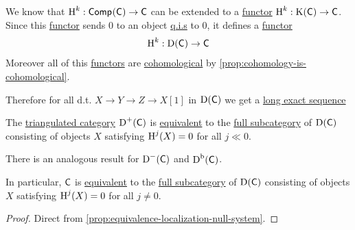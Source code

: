 \documentclass[../../main]{subfiles}
\begin{document}
\begin{remark}
  We know that \(\operatorname{H}^{k}: \mathsf{Comp}^{}(\mathsf{C}) \to \mathsf{C}\) can be extended to a \hyperref[def:functor]{functor} \(\operatorname{H}^{k}: \operatorname{K}(\mathsf{C}) \to \mathsf{C}\).
  Since this \hyperref[def:functor]{functor} sends 0 to an object \hyperref[def:quasi-isomorphism]{q.i.s} to 0, it defines a \hyperref[def:functor]{functor}
  \begin{equation*}
    \operatorname{H}^{k}: \operatorname{D}(\mathsf{C}) \to \mathsf{C}
  \end{equation*}
  Moreover all of this \hyperref[def:functor]{functors} are \hyperref[def:cohomological-functor]{cohomological} by \autoref{prop:cohomology-is-cohomological}.

  Therefore for all d.t. \(X \to Y \to Z \to X[1]\) in \(\operatorname{D}(\mathsf{C})\) we get a \hyperref[def:exact-sequence]{long exact sequence}
  \begin{center}
  \end{center}
\end{remark}

\begin{proposition}
  The \hyperref[def:triangulated-category]{triangulated category} \(\operatorname{D}^{+}(\mathsf{C})\) is \hyperref[def:equivalent-categories]{equivalent} to the \hyperref[def:subcategory]{full subcategory} of \(\operatorname{D}(\mathsf{C})\) consisting of objects \(X\) satisfying \(\operatorname{H}^{j}(X) = 0\) for all \(j \ll 0\).

  There is an analogous result for \(\operatorname{D}^{-}(\mathsf{C})\) and \(\operatorname{D}^{\operatorname{b}}(\mathsf{C})\).

  In particular, \(\mathsf{C}\) is \hyperref[def:equivalent-categories]{equivalent} to the  \hyperref[def:subcategory]{full subcategory} of \(\operatorname{D}(\mathsf{C})\) consisting of objects \(X\) satisfying \(\operatorname{H}^{j}(X) = 0\) for all \(j \neq 0\).
\end{proposition}
\begin{proof}
  Direct from \autoref{prop:equivalence-localization-null-system}.
\end{proof}
\end{document}
